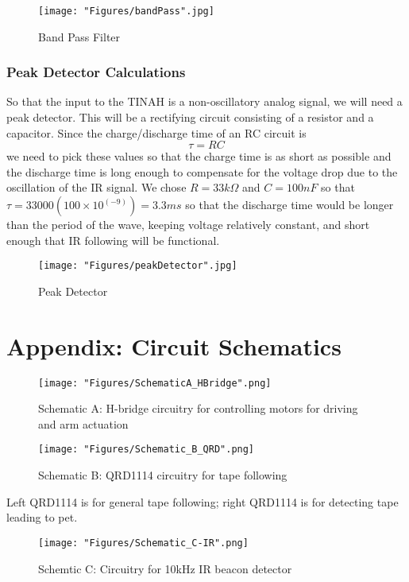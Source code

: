 		\begin{figure}[h]
			\centering
			\texttt{[image: "Figures/bandPass".jpg]}
			\caption*{Band Pass Filter}
		\end{figure}
		
		\newpage
		\subsubsection{Peak Detector Calculations}
		So that the input to the TINAH is a non-oscillatory analog signal, we will need a peak detector. This will be a rectifying circuit consisting of a resistor and a capacitor. Since the charge/discharge time of an RC circuit is
		$$\tau = RC$$
		we need to pick these values so that the charge time is as short as possible and the discharge time is long enough to compensate for the voltage drop due to the oscillation of the IR signal. We chose $R = 33k\Omega$ and $C = 100 nF$ so that $\tau = 33000(100\times 10^(-9)) = 3.3ms$ so that the discharge time would be longer than the period of the wave, keeping voltage relatively constant, and short enough that IR following will be functional.
		
		\begin{figure}[h]
			\centering
			\texttt{[image: "Figures/peakDetector".jpg]}
			\caption*{Peak Detector}
		\end{figure}
\newpage
	
\section{Appendix: Circuit Schematics}
\label{AppendixB}
\begin{figure}[h]
	\centering
	\texttt{[image: "Figures/SchematicA\_HBridge".png]}
	\caption*{Schematic A: H-bridge circuitry for controlling motors for driving and arm actuation}
	\label{sch:A}
\end{figure}
\newpage
\begin{figure}[ht]
	\centering
	\texttt{[image: "Figures/Schematic\_B\_QRD".png]}
	\caption*{Schematic B: QRD1114 circuitry for tape following}
	\label{sch:B}
\end{figure}

Left QRD1114 is for general tape following; right QRD1114 is for detecting tape leading to pet.

\newpage
\begin{figure}[ht]
	\centering
	\texttt{[image: "Figures/Schematic\_C-IR".png]}
	\caption*{Schemtic C: Circuitry for 10kHz IR beacon detector}
	\label{sch:C}
\end{figure}

